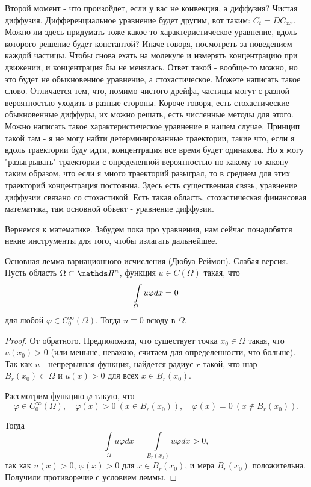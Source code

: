 Второй момент - что произойдет, если у вас не конвекция, а диффузия? Чистая диффузия. Дифференциальное уравнение будет другим, вот таким: $C_t = DC_{xx}$. Можно ли здесь придумать тоже какое-то характеристическое уравнение, вдоль которого решение будет константой? Иначе говоря, посмотреть за поведением каждой частицы. Чтобы снова ехать на молекуле и измерять концентрацию при движении, и концентрация бы не менялась. Ответ такой - вообще-то можно, но это будет не обыкновенное уравнение, а стохастическое. Можете написать такое слово. Отличается тем, что, помимо чистого дрейфа, частицы могут с разной вероятностью уходить в разные стороны. Короче говоря, есть стохастические обыкновенные диффуры, их можно решать, есть численные методы для этого.
Можно написать такое характеристическое уравнение в нашем случае. Принцип такой там - я не могу найти детерминированные траектории, такие что, если я вдоль траектории буду идти, концентрация все время будет одинакова. Но я могу "разыгрывать" траектории с определенной вероятностью по какому-то закону таким образом, что если я много траекторий разыграл, то в среднем для этих траекторий концентрация постоянна. Здесь есть существенная связь, уравнение диффузии связано со стохастикой. Есть такая область, стохастическая финансовая математика, там основной объект - уравнение диффузии.

Вернемся к математике. Забудем пока про уравнения, нам сейчас понадобятся некие инструменты для того, чтобы излагать дальнейшее.

\begin{lemma}{Основная лемма вариационного исчисления (Дюбуа-Реймон). Слабая версия.}
Пусть область $\Omega \subset \real^n$, функция $u \in C(\Omega)$ такая, что 
$$\displaystyle \int \limits_{\Omega} u \varphi dx = 0$$ 
для любой $\varphi \in C_0^\infty(\Omega)$. Тогда $u \equiv 0$ всюду в $\Omega$.
\end{lemma}

\begin{proof}
От обратного. Предположим, что существует точка $x_0 \in \Omega$ такая, что $u(x_0) > 0$ (или меньше, неважно, считаем для определенности, что больше). 
Так как $u$ - непрерывная функция, найдется радиус $r$ такой, что шар $B_r(x_0) \subset \Omega$ и $u(x) > 0$ для всех $x \in B_r(x_0)$.

Рассмотрим функцию $\varphi$ такую, что 
$$\varphi \in C_0^\infty(\Omega),\quad \varphi(x) > 0 \ (x \in B_r(x_0)),\quad \varphi(x) = 0 \ (x \notin B_r(x_0)).$$

Тогда
$$\int \limits_{\Omega} u \varphi dx = \int \limits_{B_r(x_0)} u \varphi dx > 0,$$ 
так как $u(x) > 0$, $\varphi(x) > 0$ для $x \in B_r(x_0)$, и мера $B_r(x_0)$ положительна. Получили противоречие с условием леммы.
\end{proof}

